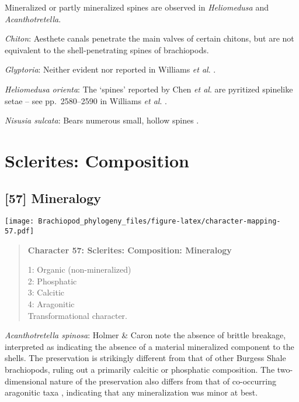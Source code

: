 \documentclass[openany]{book}
\theoremstyle{definition}
\theoremstyle{definition}
\theoremstyle{definition}
\theoremstyle{remark}
\begin{document}
Mineralized or partly mineralized spines are observed in
\emph{Heliomedusa} and \emph{Acanthotretella}.

\hypertarget{Chiton-coding-56}{}
\emph{Chiton}: Aesthete canals penetrate the main valves of certain
chitons, but are not equivalent to the shell-penetrating spines of
brachiopods.

\hypertarget{Glyptoria-coding-56}{}
\emph{Glyptoria}: Neither evident nor reported in Williams \emph{et al}.
\citeyearpar{Williams2000LinguliformeaCraniiformea}.

\hypertarget{Heliomedusa_orienta-coding-56}{}
\emph{Heliomedusa orienta}: The `spines' reported by Chen \emph{et al}.
\citeyearpar{Chen2007Reinterpretationof} are pyritized spinelike\\
setae -- see pp.~2580--2590 in Williams \emph{et al}.
\citeyearpar{Williams2007Supplement}.

\hypertarget{Nisusia_sulcata-coding-56}{}
\emph{Nisusia sulcata}: Bears numerous small, hollow spines
\citep{Williams2000LinguliformeaCraniiformea}.

\section{Sclerites: Composition}\label{sclerites-composition}

\subsection*{{[}57{]} Mineralogy}\label{mineralogy}

\texttt{[image: Brachiopod\_phylogeny\_files/figure-latex/character-mapping-57.pdf]}

\begin{quote}
\textbf{Character 57: Sclerites: Composition: Mineralogy}

1: Organic (non-mineralized)\\
2: Phosphatic\\
3: Calcitic\\
4: Aragonitic\\
Transformational character.
\end{quote}

\hypertarget{Acanthotretella_spinosa-coding-57}{}
\emph{Acanthotretella spinosa}: Holmer \& Caron
\citeyearpar{Holmer2006Aspinose} note the absence of brittle breakage,
interpreted as indicating the absence of a material mineralized
component to the shells. The preservation is strikingly different from
that of other Burgess Shale brachiopods, ruling out a primarily calcitic
or phosphatic composition. The two-dimensional nature of the
preservation also differs from that of co-occurring aragonitic taxa
\citep[hyoliths;][ p.~273]{Holmer2006Aspinose}, indicating that any
mineralization was minor at best.
\end{document}
